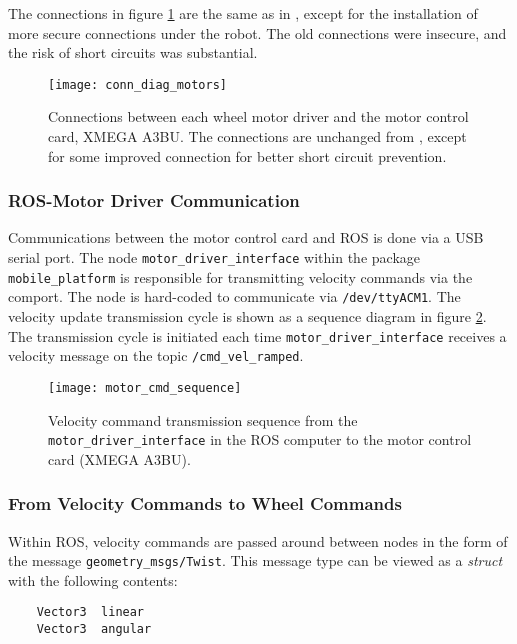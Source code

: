 The connections in figure \ref{fig:conn_diag_motors} are the same as in \cite{aspunvik}, except for the installation of more secure connections under the robot. The old connections were insecure, and the risk of short circuits was substantial.

\begin{figure}[h]
	\centering
	\texttt{[image: conn\_diag\_motors]}
	\caption{Connections between each wheel motor driver and the motor control card, XMEGA A3BU. The connections are unchanged from \cite{aspunvik}, except for some improved connection for better short circuit prevention.}
	\label{fig:conn_diag_motors}
\end{figure}

\newpage

\subsubsection{ROS-Motor Driver Communication}

Communications between the motor control card and \ac{ROS} is done via a USB serial port. The node \texttt{motor\_driver\_interface} within the package \texttt{mobile\_platform} is responsible for transmitting velocity commands via the comport. The node is hard-coded to communicate via \texttt{/dev/ttyACM1}.  The velocity update transmission cycle is shown as a sequence diagram in figure \ref{fig:motor_cmd_sequence}. The transmission cycle is initiated each time \texttt{motor\_driver\_interface} receives a velocity message on the topic \texttt{/cmd\_vel\_ramped}.

\begin{figure}[H]
	\centering
	\texttt{[image: motor\_cmd\_sequence]}
	\caption{Velocity command transmission sequence from the \texttt{motor\_driver\_interface} in the ROS computer to the motor control card (XMEGA A3BU).}
	\label{fig:motor_cmd_sequence}
\end{figure}


\subsubsection{From Velocity Commands to Wheel Commands}
\label{sec:velocity2wheels}
Within \ac{ROS}, velocity commands are passed around between nodes in the form of the message \texttt{geometry\_msgs/Twist}. This message type can be viewed as a \textit{struct} with the following contents:

\begin{verbatim}
	Vector3  linear
	Vector3  angular
\end{verbatim}

